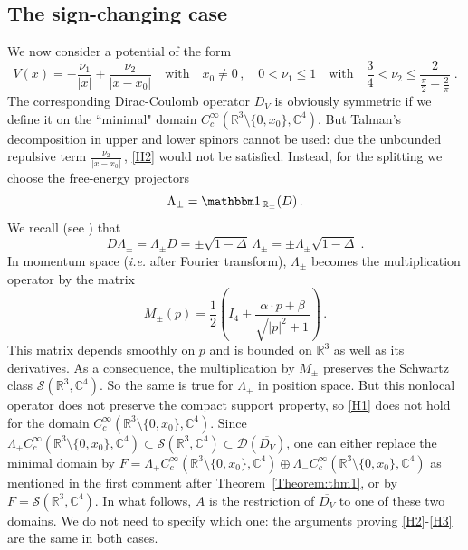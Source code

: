 \documentclass[12pt,reqno]{amsart}
\newcommand{\R}{{\mathbb R}}
\newcommand{\C}{{\mathbb C}}
\renewcommand{\(}{\left(}
\renewcommand{\)}{\right)}
\begin{document}
\subsection{The sign-changing case}\label{subsection: sign-changing}

We now consider a potential of the form
\[
V(x)=-\frac{\nu_1}{|x|}+\frac{\nu_2}{|x-x_0|}\quad\mbox{with}\quad x_0\neq 0\,,\quad0<\nu_1\le 1\quad\mbox{with}\quad\frac34<\nu_2\le \frac2{\frac\pi2+\frac2\pi}\;.
\]
The corresponding Dirac-Coulomb operator $D_V$ is obviously symmetric if we define it on the ``minimal" domain $C^\infty_c(\R^3\setminus\{0,x_0\}, \C^4)$.
But Talman's decomposition in upper and lower spinors cannot be used: due the unbounded repulsive term $\frac{\nu_2}{\vert x-x_0\vert}\,$, \eqref{H2} would not be satisfied. Instead, for the splitting we choose the free-energy projectors
\[
\Lambda_\pm=\mathbbm 1_{\,\R_{\pm}}(D)\,.
\]
We recall (see \cite{thaller}) that
\[D\Lambda_\pm=\Lambda_\pm D=\pm\sqrt{1-\Delta}\,\Lambda_\pm=\pm\Lambda_\pm\sqrt{1-\Delta}\;.\]
In momentum space ({\it i.e.} after Fourier transform), $\Lambda_\pm$ becomes the multiplication operator by the matrix \[M_\pm(p)=\frac{1}{2}\left(I_4\pm \frac{\alpha\cdot p+\beta}{\sqrt{\vert p\vert^2+1}}\right)\,.\]
This matrix depends smoothly on $p$ and is bounded on $\R^3$ as well as its derivatives. As a consequence, the multiplication by $M_\pm$ preserves the Schwartz class $\mathcal S(\R^3,\mathbb{C}^4)$. So the same is true for $\Lambda_\pm$ in position space. But this nonlocal operator does not preserve the compact support property, so \eqref{H1} does not hold for the domain $C^\infty_c(\R^3\setminus\{0,x_0\}, \C^4)$. Since $\Lambda_+C^\infty_c(\R^3\setminus\{0,x_0\}, \C^4)\subset \mathcal S(\R^3,\mathbb{C}^4)\subset\mathcal D(\overline{D_V})$, one can either replace the minimal domain by $F=\Lambda_+C^\infty_c(\R^3\setminus\{0,x_0\}, \C^4)\oplus \Lambda_-C^\infty_c(\R^3\setminus\{0,x_0\}, \C^4)$ as mentioned in the first comment after Theorem~\ref{Theorem:thm1}, or by $F=\mathcal S(\R^3,\mathbb{C}^4)$. In what follows, $A$ is the restriction of $\overline{D_V}$ to one of these two domains. We do not need to specify which one: the arguments proving \eqref{H2}-\eqref{H3} are the same in both cases.
\end{document}
